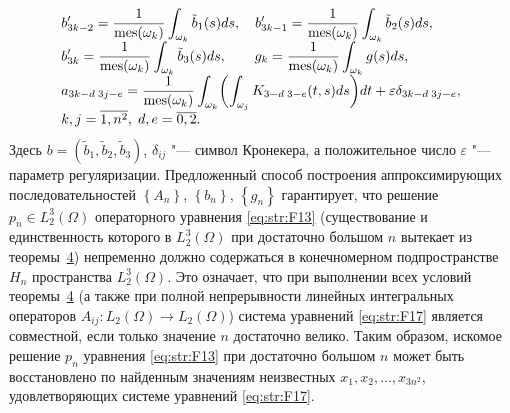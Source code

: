\begin{equation} 
\label{eq:str:F18}
\begin{array}{l} 
 \displaystyle b'_{3k-2} =\frac{1}{\mathop{\rm mes}(\omega _{k} )} \int _{\omega _{k} }\tilde{b}_{1} (s)ds, 
 \quad 
   b'_{3k-1} =\frac{1}{\mathop{\rm mes}(\omega _{k} )} \int _{\omega _{k} }\tilde{b}_{2} (s)ds,  \\[2mm]
\displaystyle 
b'_{3k} =\frac{1}{\mathop{\rm mes}(\omega _{k} )} \int _{\omega _{k} }\tilde{b}_{3} (s)ds, 
\qquad  
g_{k} =\frac{1}{\mathop{\rm mes}(\omega _{k})} \int _{\omega _{k} }g(s)ds,  
\\[2mm] 
\displaystyle 
a_{3k-d \; 3j-e} =\frac{1}{\mathop{\rm mes}(\omega _{k} )} \int _{\omega _{k} }\biggl(\int _{\omega _{j} }K_{3-d \; 3-e} (t, s)ds \biggr)dt+\varepsilon \delta _{3k-d \; 3j-e} , \\
k,j=\overline{1,n^{2} }, \; d, e=\overline{0, 2}. 
\end{array} 
\end{equation}
Здесь $b=(\tilde{b}_{1} ,\tilde{b}_{2} ,\tilde{b}_{3} )$, $\delta _{ij} $ "--- символ Кронекера, а положительное число $\varepsilon $ "--- параметр регуляризации.
Предложенный способ построения аппроксимирующих последовательностей $\left\{A_{n} \right\}$, $\left\{b_{n} \right\}$, $\left\{g_{n} \right\}$ гарантирует, что решение $p_{n} \in L_{2}^{3} (\Omega)$ операторного уравнения \eqref{eq:str:F13} (существование и единственность которого в $L_{2}^{3} (\Omega)$ при достаточно большом $n$ вытекает из теоремы~\hyperlink{str:th4}{4}) непременно должно содержаться в конечномерном подпространстве $H_{n} $ пространства $L_{2}^{3} (\Omega)$.
Это означает, что при выполнении всех условий теоремы~\hyperlink{str:th4}{4} (а также при полной непрерывности линейных интегральных операторов $A_{ij} \colon L_{2} (\Omega)\to L_{2} (\Omega)$) система уравнений \eqref{eq:str:F17} является совместной, если только значение $n$ достаточно велико.
Таким образом, искомое решение $p_{n} $ уравнения \eqref{eq:str:F13} при достаточно большом $n$ может быть восстановлено по найденным значениям неизвестных $x_{1} ,x_{2} ,\dots, x_{3n^{2} } $, удовлетворяющих системе уравнений \eqref{eq:str:F17}.


